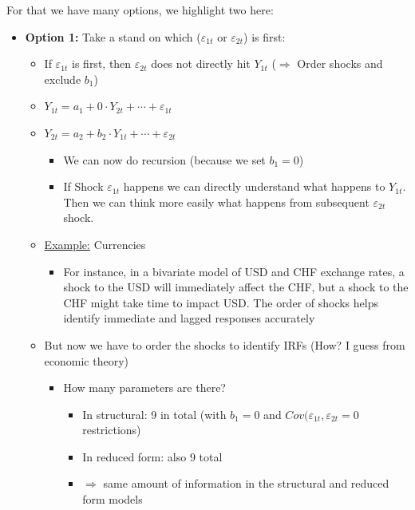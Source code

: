 For that we have many options, we highlight two here:
\begin{itemize}
    \item \textbf{Option 1:} Take a stand on which ($\varepsilon_{1t}$ or $\varepsilon_{2t}$) is first:
    \begin{itemize}
        \item If $\varepsilon_{1t}$ is first, then $\varepsilon_{2t}$ does not directly hit $Y_{1t}$ ($\Rightarrow$ Order shocks and exclude $b_1$)
        \item[] $Y_{1t} = a_1 + 0\cdot Y_{2t} + \cdots + \varepsilon_{1t}$
        \item[] $Y_{2t} = a_2 + b_2 \cdot Y_{1t} + \cdots + \varepsilon_{2t}$
        \begin{itemize}
            \item We can now do recursion (because we set $b_1=0$)
            \item If Shock $\varepsilon_{1t}$ happens we can directly understand what happens to $Y_{1t}$. Then we can think more easily what happens from subsequent $\varepsilon_{2t}$ shock.
        \end{itemize}
        \item \underline{Example:} Currencies
        \begin{itemize}
            \item For instance, in a bivariate model of USD and CHF exchange rates, a shock to the USD will immediately affect the CHF, but a shock to the CHF might take time to impact USD. The order of shocks helps identify immediate and lagged responses accurately 
        \end{itemize}
        \item But now we have to order the shocks to identify IRFs (How? I guess from economic theory)
        \begin{itemize}
            \item How many parameters are there?
            \begin{itemize}
                \item In structural: 9 in total (with $b_1 = 0$ and $Cov(\varepsilon_{1t},\varepsilon_{2t}=0$ restrictions)
                \item In reduced form: also 9 total
                \item $\Rightarrow$ same amount of information in the structural and reduced form models
            \end{itemize}
        \end{itemize}

\end{itemize}
\end{itemize}
